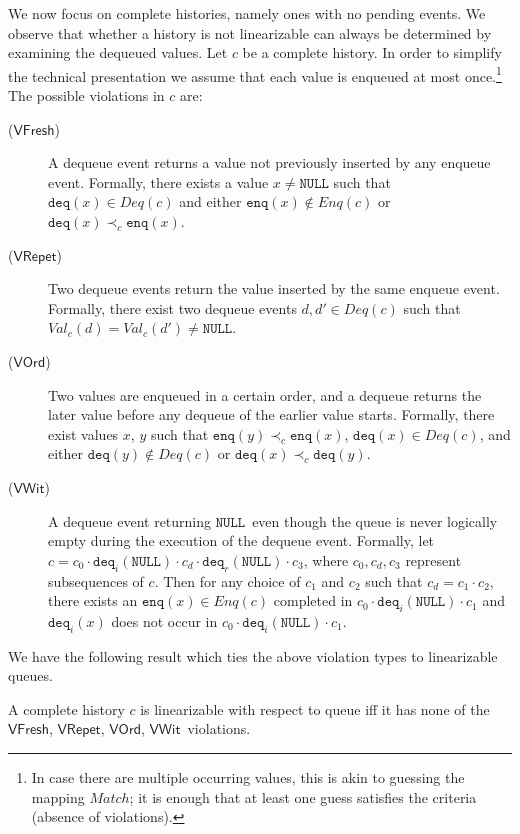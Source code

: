 \documentclass{LMCS}
\newcommand{\NULL}{\ensuremath{\mathtt{NULL}}}
\newcommand{\enq}{\ensuremath{\mathtt{enq}}}
\newcommand{\deq}{\ensuremath{\mathtt{deq}}}
\newcommand{\Match}{\ensuremath{\mathit{Match}}}
\newcommand{\Deq}[1]{\ensuremath{\mathit{Deq}({#1})}}
\newcommand{\Enq}[1]{\ensuremath{\mathit{Enq}({#1})}}
\newcommand{\Val}[2]{\ensuremath{\mathit{Val}_{#1}({#2})}}
\newcommand\mylabel[1]{\label{#1}}
\newcommand{\VFresh}{\ensuremath{\mathsf{VFresh}}}
\newcommand{\VRepet}{\ensuremath{\mathsf{VRepet}}}
\newcommand{\VOrd}{\ensuremath{\mathsf{VOrd}}}
\newcommand{\VWit}{\ensuremath{\mathsf{VWit}}}
\begin{document}
We now focus on complete histories, namely ones with no pending events. 
We observe that whether a history is not linearizable can always be determined by examining the dequeued values. 
Let $c$ be a complete history.
In order to simplify the technical presentation we assume that each value is enqueued at most once.\footnote{In case there are multiple occurring values, this is akin to guessing the mapping {\Match}; it is enough that at least one guess satisfies the criteria (absence of violations).}
The possible violations in $c$ are: 
\begin{description}
\item[(\VFresh)] A dequeue event returns a value not previously inserted by any enqueue event.
Formally, there exists a value $x\neq\NULL$ such that $\deq(x)\in \Deq c$ and either $\enq(x) \notin \Enq c$ or $\deq(x) \prec_c \enq(x)$.
\item[(\VRepet)] Two dequeue events return the value inserted by the same enqueue event.
Formally, there exist two dequeue events $d,d'\in \Deq c$ such that $\Val c d=\Val c {d'}\neq\NULL$.
\item[(\VOrd)]
Two values are enqueued in a certain order, and a dequeue returns the later value before any dequeue of the earlier value starts.
Formally, there exist values $x$, $y$ such that $\enq(y) \prec_c \enq(x)$, $\deq(x)\in \Deq c$, and either $\deq(y)\notin \Deq c$ or $\deq(x) \prec_c \deq(y)$.
\item[(\VWit)] A dequeue event returning \NULL\ even though the queue is never logically empty during the execution of the dequeue event.
Formally, let $c=c_0\cdot \deq_i(\NULL) \cdot c_d\cdot \deq_r(\NULL) \cdot c_3$, where $c_0,c_d,c_3$ represent subsequences of $c$.
Then for any choice of $c_1$ and $c_2$ such that $c_d=c_1\cdot c_2$, there exists an $\enq(x)\in \Enq c$ completed in $c_0\cdot \deq_i(\NULL) \cdot c_1$ and $\deq_i(x)$ does not occur in $c_0\cdot \deq_i(\NULL) \cdot c_1$.
\end{description}\smallskip

\noindent We have the following result which ties the above violation types to linearizable queues.

\begin{prop}\mylabel{prop:compl-viol}
A complete history $c$ is linearizable with respect to queue iff it has none of the \VFresh, \VRepet, \VOrd, \VWit\ violations.
\end{prop}
\end{document}
